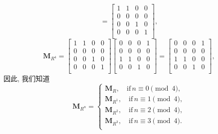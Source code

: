 \documentclass[10pt,UTF8]{book} %
\begin{document}
\begin{exercise}
\begin{sol}
\[        = \begin{bmatrix}
            1 & 1 & 0 & 0 \\
            0 & 0 & 0 & 0 \\
            0 & 0 & 1 & 0 \\
            0 & 0 & 0 & 1 \\
        \end{bmatrix}, \]
        \[ \boldsymbol{M}_{R^4} = \begin{bmatrix}
            1 & 1 & 0 & 0 \\
            0 & 0 & 0 & 0 \\
            0 & 0 & 1 & 0 \\
            0 & 0 & 0 & 1 \\
        \end{bmatrix} \begin{bmatrix}
            0 & 0 & 0 & 1 \\
            0 & 0 & 0 & 0 \\
            1 & 1 & 0 & 0 \\
            0 & 0 & 1 & 0 \\
        \end{bmatrix}
        = \begin{bmatrix}
            0 & 0 & 0 & 1 \\
            0 & 0 & 0 & 0 \\
            1 & 1 & 0 & 0 \\
            0 & 0 & 1 & 0 \\
        \end{bmatrix}, \]
        因此, 我们知道
        \[ \boldsymbol{M}_{R^n}
        = \begin{cases}
            \boldsymbol{M}_{R}, \quad\mathrm{if}\, n \equiv 0 \pmod 4, \\
            \boldsymbol{M}_{R^1},\quad \mathrm{if}\, n \equiv 1 \pmod 4, \\
            \boldsymbol{M}_{R^2},\quad \mathrm{if}\, n \equiv 2 \pmod 4, \\
            \boldsymbol{M}_{R^3},\quad \mathrm{if}\, n \equiv 3 \pmod 4. \\
        \end{cases} \]
    \end{sol}
\end{exercise}
\end{document}
